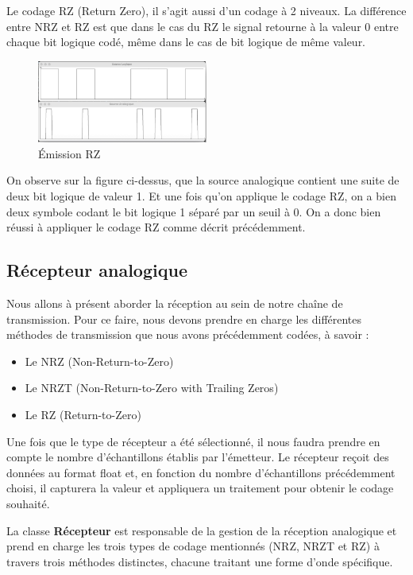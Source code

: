 Le codage RZ (Return Zero), il s’agit aussi d’un codage à 2 niveaux. La différence entre NRZ et RZ est que dans le cas du RZ le signal retourne à la valeur 0 entre chaque bit logique codé, même dans le cas de bit logique de même valeur.

\begin{figure}[H]
    \centering
    \includegraphics[width=0.5\textwidth]{img/etape2_emission_RZ.png}
    \caption{Émission RZ}
    \label{fig:emission_rz}
\end{figure}

On observe sur la figure ci-dessus, que la source analogique contient une suite de deux bit logique de valeur 1. Et une fois qu’on applique le codage RZ, on a bien deux symbole codant le bit logique 1 séparé par un seuil à 0. On a donc bien réussi à appliquer le codage RZ comme décrit précédemment.

\subsection{Récepteur analogique}

Nous allons à présent aborder la réception au sein de notre chaîne de transmission. Pour ce faire, nous devons prendre en charge les différentes méthodes de transmission que nous avons précédemment codées, à savoir :

\begin{itemize}
    \item Le NRZ (Non-Return-to-Zero)
    \item Le NRZT (Non-Return-to-Zero with Trailing Zeros)
    \item Le RZ (Return-to-Zero)
\end{itemize}

Une fois que le type de récepteur a été sélectionné, il nous faudra prendre en compte le nombre d'échantillons établis par l'émetteur. Le récepteur reçoit des données au format float et, en fonction du nombre d'échantillons précédemment choisi, il capturera la valeur et appliquera un traitement pour obtenir le codage souhaité.

La classe \textbf{Récepteur} est responsable de la gestion de la réception analogique et prend en charge les trois types de codage mentionnés (NRZ, NRZT et RZ) à travers trois méthodes distinctes, chacune traitant une forme d'onde spécifique.

